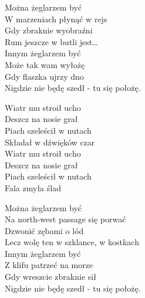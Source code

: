 \begin{text}
    Można żeglarzem być\\
    W marzeniach płynąć w rejs\\
    Gdy zbraknie wyobraźni\\
    Rum jeszcze w butli jest…\\
    Innym żeglarzem być\\
    Może tak wam wyłożę\\
    Gdy flaszka ujrzy dno\\
    Nigdzie nie będę szedł - tu się położę.

    Wiatr mu stroił ucho\\
    Deszcz na nosie grał\\
    Piach szeleścił w nutach\\
    Składał w dźwięków czar\\
    Wiatr mu stroił ucho\\
    Deszcz na nosie grał\\
    Piach szeleścił w nutach\\
    Fala zmyła ślad

    Można żeglarzem być\\
    Na north-west passage się porwać\\
    Dzwonić zębami o lód\\
    Lecz wolę ten w szklance, w kostkach\\
    Innym żeglarzem być\\
    Z klifu patrzeć na morze\\
    Gdy wreszcie zbraknie sił\\
    Nigdzie nie będę szedł - tu się położę.
\end{text}
\begin{chord}

\end{chord}